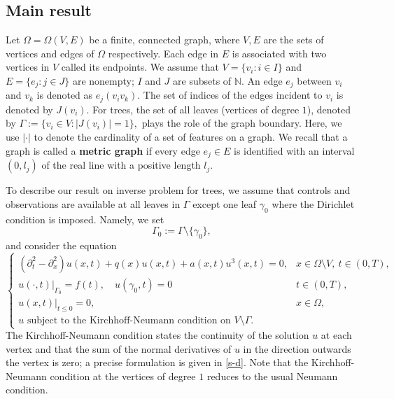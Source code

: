 \documentclass[11pt]{amsart}
\theoremstyle{definition}
\theoremstyle{plain}
\numberwithin{equation}{section}
\begin{document}
\subsection{Main result}

Let $\Omega=\Omega(V,E)$ be a finite, connected graph, where $V,E$ are the sets of vertices and edges of $\Omega$ respectively.  Each edge in $E$ is associated with two vertices in $V$ called its endpoints.  We assume that $V = \{v_i: i \in I\}$ and $E= \{e_j: j \in J\}$ are nonempty;  $I$ and $J$ are subsets of $\mathbb{N}.$ 
An edge $e_j$ between $v_i$ and $v_k$ is denoted as $e_j(v_iv_k)$.  The set of indices of the edges  incident to $v_i$ is denoted by $J(v_i)$.  For trees,  the set of all leaves (vertices of degree $1$), denoted by  $ \Gamma:=\{v_i \in  V: |J(v_i)|=1\}, $  plays the role of the graph boundary.
Here, we use $|\cdot|$ to denote the cardinality of a set of features on a graph. 
We recall that a graph is called a {\bf metric graph} if every edge $ e_j \in E$  is identified with an interval $(0,l_j) $ of the real line with a positive length $l_j$. 


 
To describe our result on inverse problem for trees, we assume that controls and observations are available at all leaves in $\Gamma$ except one leaf $\gamma_0$ where the Dirichlet condition is imposed.
Namely, we set 
\begin{equation}
\Gamma_0:=\Gamma\setminus \{\gamma_0\},
\end{equation}
and consider the equation
\begin{equation}\label{eq-wave-nonlinear}
    \begin{cases}
    (\partial_{t}^2 -\partial_x^2 ) u(x,t)+q(x) u(x,t)+a(x,t)u^3(x,t)=0, &x\in \Omega\setminus V, \ t \in (0,T),\\
    u(\cdot,t)|_{\Gamma_0}=f(t),\quad u(\gamma_0,t)=0 & t \in (0,T),\\
    u(x,t)|_{t \leq 0}=0, &  x\in \Omega, \\
          u \textrm{ subject to the Kirchhoff-Neumann condition on } V\setminus\Gamma.
    \end{cases}
\end{equation}
The Kirchhoff-Neumann condition states the continuity of the solution $u$  at each vertex 
and
that the sum of the normal derivatives of $u$  in the direction outwards the vertex is zero; a precise formulation is given in \eqref{s-d}.
Note that the Kirchhoff-Neumann condition at the vertices of degree $1$ reduces to the usual Neumann condition.
\end{document}
